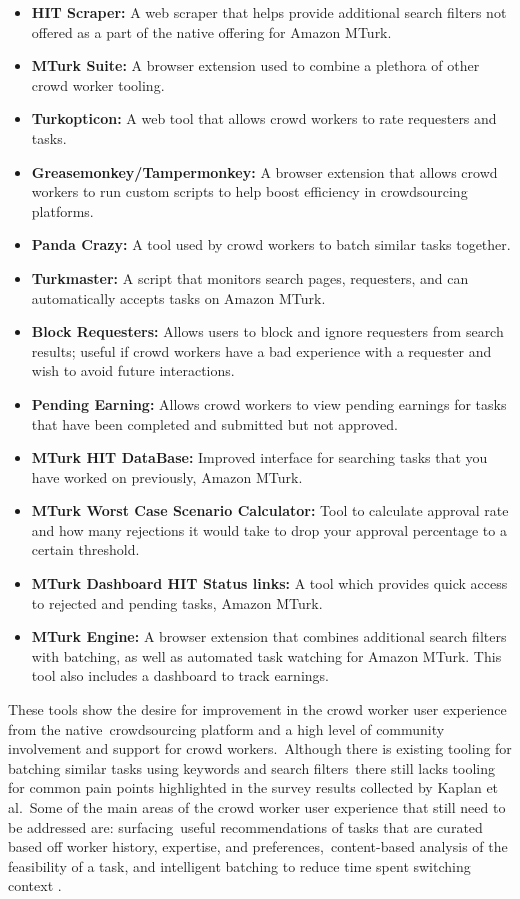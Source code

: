 \documentclass[letterpaper,12pt]{article}
\begin{document}
\begin{itemize}
	\item \textbf{HIT Scraper:} A web scraper that helps provide additional search filters not offered as a part of the native offering for Amazon MTurk.
	\item \textbf{MTurk Suite:} A browser extension used to combine a plethora of other crowd worker tooling.
	\item \textbf{Turkopticon:} A web tool that allows crowd workers to rate requesters and tasks.
	\item \textbf{Greasemonkey/Tampermonkey:} A browser extension that allows crowd workers to run custom scripts to help boost efficiency in crowdsourcing platforms.
	\item \textbf{Panda Crazy:} A tool used by crowd workers to batch similar tasks together.
	\item \textbf{Turkmaster:} A script that monitors search pages, requesters, and can automatically accepts tasks on Amazon MTurk.
	\item \textbf{Block Requesters:} Allows users to block and ignore requesters from search results; useful if crowd workers have a bad experience with a requester and wish to avoid future interactions.
	\item \textbf{Pending Earning:} Allows crowd workers to view pending earnings for tasks that have been completed and submitted but not approved.
	\item \textbf{MTurk HIT DataBase:} Improved interface for searching tasks that you have worked on previously, Amazon MTurk.
	\item \textbf{MTurk Worst Case Scenario Calculator:} Tool to calculate approval rate and how many rejections it would take to drop your approval percentage to a certain threshold.
	\item \textbf{MTurk Dashboard HIT Status links:} A tool which provides quick access to rejected and pending tasks, Amazon MTurk.
	\item \textbf{MTurk Engine:} A browser extension that combines additional search filters with batching, as well as automated task watching for Amazon MTurk. This tool also includes a dashboard to track earnings.
\end{itemize}

These tools show the desire for improvement in the crowd worker user experience from the native\
crowdsourcing platform and a high level of community involvement and support for crowd workers.\
Although there is existing tooling for batching similar tasks using keywords and search filters\
there still lacks tooling for common pain points highlighted in the survey results collected by Kaplan et al.\
Some of the main areas of the crowd worker user experience that still need to be addressed are: surfacing\
useful recommendations of tasks that are curated based off worker history, expertise, and preferences,\
content-based analysis of the feasibility of a task, and intelligent batching to reduce time spent switching
context .
\end{document}
